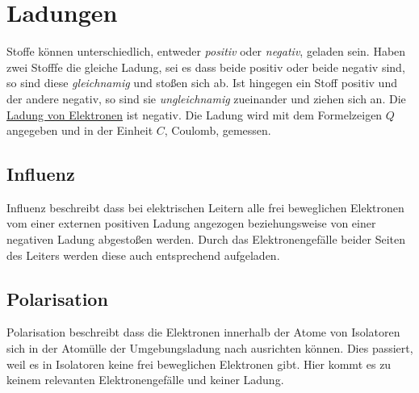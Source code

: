 \documentclass{article}
\begin{document}
 
\section{Ladungen}
Stoffe können unterschiedlich, entweder \emph{positiv} oder \emph{negativ}, geladen sein. Haben zwei Stofffe die gleiche Ladung, sei es dass beide positiv oder beide negativ sind, so sind diese \emph{gleichnamig} und stoßen sich ab. Ist hingegen ein Stoff positiv und der andere negativ, so sind sie \emph{ungleichnamig} zueinander und ziehen sich an. Die \hyperref[Ladung von Elektronen]{Ladung von Elektronen} ist negativ. \newline
Die Ladung wird mit dem Formelzeigen $Q$ angegeben und in der Einheit $C$, Coulomb, gemessen. 
 
\begin{multicols}{2} 
 \raggedcolumns %
 \subsection{Influenz}
 Influenz beschreibt dass bei elektrischen Leitern alle frei beweglichen Elektronen vom einer externen positiven Ladung angezogen beziehungsweise von einer negativen Ladung abgestoßen werden. Durch das Elektronengefälle beider Seiten des Leiters werden diese auch entsprechend aufgeladen.
 \begin{center}
 \end{center}
 \columnbreak
 \subsection{Polarisation}
 Polarisation beschreibt dass die Elektronen innerhalb der Atome von Isolatoren sich in der Atomülle der Umgebungsladung nach ausrichten können. Dies passiert, weil es in Isolatoren keine frei beweglichen Elektronen gibt. Hier kommt es zu keinem relevanten Elektronengefälle und keiner Ladung.
 \begin{center}
\end{center}
\end{multicols}
\end{document}
